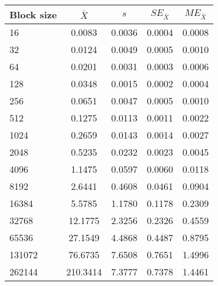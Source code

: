 \begin{tabular}{lcccc}\toprule
{\small Block size} & $\bar{X}$ & $s$ & $SE_{\bar{X}}$ & $ME_{\bar{X}}$ \\\midrule
16 & 0.0083 & 0.0036 & 0.0004 & 0.0008\\
32 & 0.0124 & 0.0049 & 0.0005 & 0.0010\\
64 & 0.0201 & 0.0031 & 0.0003 & 0.0006\\
128 & 0.0348 & 0.0015 & 0.0002 & 0.0004\\
256 & 0.0651 & 0.0047 & 0.0005 & 0.0010\\
512 & 0.1275 & 0.0113 & 0.0011 & 0.0022\\
1024 & 0.2659 & 0.0143 & 0.0014 & 0.0027\\
2048 & 0.5235 & 0.0232 & 0.0023 & 0.0045\\
4096 & 1.1475 & 0.0597 & 0.0060 & 0.0118\\
8192 & 2.6441 & 0.4608 & 0.0461 & 0.0904\\
16384 & 5.5785 & 1.1780 & 0.1178 & 0.2309\\
32768 & 12.1775 & 2.3256 & 0.2326 & 0.4559\\
65536 & 27.1549 & 4.4868 & 0.4487 & 0.8795\\
131072 & 76.6735 & 7.6508 & 0.7651 & 1.4996\\
262144 & 210.3414 & 7.3777 & 0.7378 & 1.4461\\
\bottomrule
\end{tabular}
